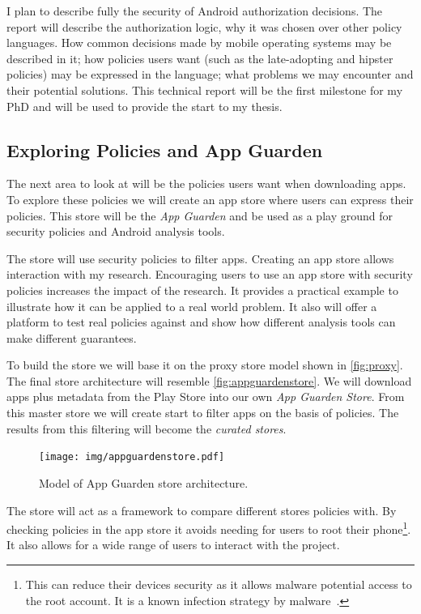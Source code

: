 \documentclass[a4paper,sfsidenotes]{%
  scrartcl%
}
\begin{document}
I plan to describe fully the security of Android authorization decisions. The
report will describe the authorization logic, why it was chosen over other
policy languages.  How common decisions made by mobile operating systems may be
described in it; how policies users want (such as the late-adopting and hipster
policies) may be expressed in the language; what problems we may encounter and
their potential solutions.  This technical report will be the first milestone
for my PhD and will be used to provide the start to my thesis.


\subsection{Exploring Policies and App Guarden}
\label{sec:appguarden}

The next area to look at will be the policies users want when downloading apps.
To explore these policies we will create an app store where users can express
their policies.  This store will be the \emph{App Guarden} and be used as a play
ground for security policies and Android analysis tools.

The store will use security policies to filter apps.  Creating an app store
allows interaction with my research.  Encouraging users to use an app store with
security policies increases the impact of the research. It provides a practical
example to illustrate how it can be applied to a real world problem.  It also
will offer a platform to test real policies against and show how different
analysis tools can make different guarantees.  

To build the store we will base it on the proxy store model shown in
\autoref{fig:proxy}.  The final store architecture will resemble
\autoref{fig:appguardenstore}.  We will download apps plus metadata from the Play Store
into our own \emph{App Guarden Store}.  From this master store we will create
start to filter apps on the basis of policies.  The results from this filtering
will become the \emph{curated stores}. 

\begin{figure}
  \centering
  \texttt{[image: img/appguardenstore.pdf]}
  \caption{Model of App Guarden store architecture.}
  \label{fig:appguardenstore}
\end{figure}

The store will act as a framework to compare different stores
policies with.  By checking policies in the app store it avoids
needing for users to root their phone\footnote{This can reduce their
devices security as it allows malware potential access to the root account.  It
is a known infection strategy by malware~\cite{Svajcer:2012wy}.}.
It also allows for a wide range of users to interact with the project. 
\end{document}
